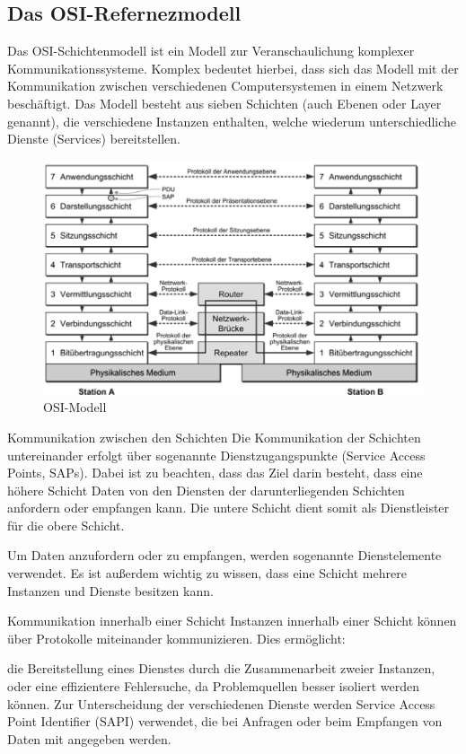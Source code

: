 \subsection{Das OSI-Refernezmodell}
Das OSI-Schichtenmodell ist ein Modell zur Veranschaulichung komplexer Kommunikationssysteme.
Komplex bedeutet hierbei, dass sich das Modell mit der Kommunikation zwischen verschiedenen Computersystemen in einem Netzwerk beschäftigt.
Das Modell besteht aus sieben Schichten (auch Ebenen oder Layer genannt), die verschiedene Instanzen enthalten, welche wiederum unterschiedliche Dienste (Services) bereitstellen.

\begin{figure}[htbp]
    \centering
    \includegraphics[width=\Bildbreite]{Grafiken/OSI.png}
    \caption{OSI-Modell}
    \label{fig: OSI}
\end{figure} 

Kommunikation zwischen den Schichten
Die Kommunikation der Schichten untereinander erfolgt über sogenannte Dienstzugangspunkte (Service Access Points, SAPs). Dabei ist zu beachten, dass das Ziel darin besteht, dass eine höhere Schicht Daten von den Diensten der darunterliegenden Schichten anfordern oder empfangen kann. Die untere Schicht dient somit als Dienstleister für die obere Schicht.

Um Daten anzufordern oder zu empfangen, werden sogenannte Dienstelemente verwendet. Es ist außerdem wichtig zu wissen, dass eine Schicht mehrere Instanzen und Dienste besitzen kann.

Kommunikation innerhalb einer Schicht
Instanzen innerhalb einer Schicht können über Protokolle miteinander kommunizieren. Dies ermöglicht:

die Bereitstellung eines Dienstes durch die Zusammenarbeit zweier Instanzen, oder
eine effizientere Fehlersuche, da Problemquellen besser isoliert werden können.
Zur Unterscheidung der verschiedenen Dienste werden Service Access Point Identifier (SAPI) verwendet, die bei Anfragen oder beim Empfangen von Daten mit angegeben werden.

